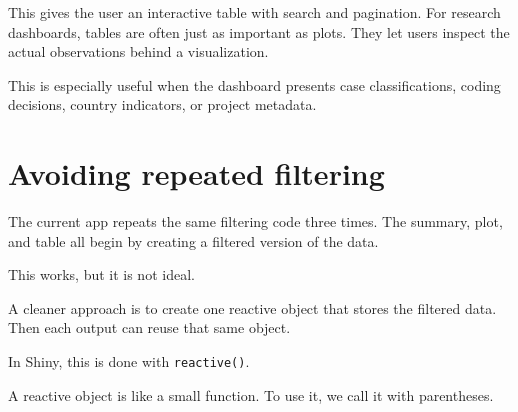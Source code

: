 \documentclass[
  letterpaper,
  DIV=11,
  numbers=noendperiod]{scrreprt}
\newenvironment{Shaded}{\begin{snugshade}}{\end{snugshade}}
\newcommand{\ControlFlowTok}[1]{\textcolor[rgb]{0.00,0.23,0.31}{\textbf{#1}}}
\newcommand{\FunctionTok}[1]{\textcolor[rgb]{0.28,0.35,0.67}{#1}}
\newcommand{\NormalTok}[1]{\textcolor[rgb]{0.00,0.23,0.31}{#1}}
\newcommand{\OtherTok}[1]{\textcolor[rgb]{0.00,0.23,0.31}{#1}}
\newcommand{\SpecialCharTok}[1]{\textcolor[rgb]{0.37,0.37,0.37}{#1}}
\newcommand{\StringTok}[1]{\textcolor[rgb]{0.13,0.47,0.30}{#1}}
\begin{document}
This gives the user an interactive table with search and pagination. For
research dashboards, tables are often just as important as plots. They
let users inspect the actual observations behind a visualization.

This is especially useful when the dashboard presents case
classifications, coding decisions, country indicators, or project
metadata.

\section{Avoiding repeated filtering}\label{avoiding-repeated-filtering}

The current app repeats the same filtering code three times. The
summary, plot, and table all begin by creating a filtered version of the
data.

This works, but it is not ideal.

A cleaner approach is to create one reactive object that stores the
filtered data. Then each output can reuse that same object.

In Shiny, this is done with \texttt{reactive()}.

\begin{Shaded}
\end{Shaded}

A reactive object is like a small function. To use it, we call it with
parentheses.
\end{document}
